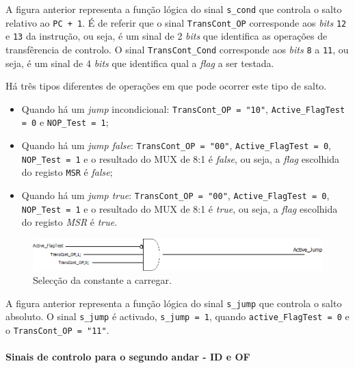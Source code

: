 \documentclass[11pt]{article}
\numberwithin{equation}{section}
\begin{document}
A figura anterior representa a função lógica do sinal \texttt{s\_cond} que controla o salto relativo ao \texttt{PC + 1}. É  de referir que o sinal \texttt{TransCont\_OP} corresponde aos \textit{bits} \texttt{12} e \texttt{13} da instrução, ou seja, é um sinal de 2 \textit{bits} que identifica as operações de transfêrencia de controlo. O sinal \texttt{TransCont\_Cond} corresponde aos \textit{bits} \texttt{8} a \texttt{11}, ou seja, é um sinal de 4 \textit{bits} que identifica qual a \textit{flag} a ser testada.

Há três tipos diferentes de operações em que pode ocorrer este tipo de salto.

\begin{itemize}
	\item Quando há um \textit{jump} incondicional: \texttt{TransCont\_OP = "10"}, \texttt{Active\_FlagTest = 0} e \texttt{NOP\_Test = 1};
	\vspace{-2.5mm}
	\item Quando há um \textit{jump false}: \texttt{TransCont\_OP = "00"}, \texttt{Active\_FlagTest = 0}, \texttt{NOP\_Test = 1} e o resultado do MUX de 8:1 é \textit{false}, ou seja, a \textit{flag} escolhida do registo \texttt{MSR} é \textit{false};
	\vspace{-2.5mm}
	\item Quando há um \textit{jump true}: \texttt{TransCont\_OP = "00"}, \texttt{Active\_FlagTest = 0}, \texttt{NOP\_Test = 1} e o resultado do MUX de 8:1 é \textit{true}, ou seja, a \textit{flag} escolhida do registo \textit{MSR} é \textit{true}.
\end{itemize}

\begin{figure}[H]
	\centering
	\includegraphics[keepaspectratio=true, scale=0.40]{imagens/activejump}
	\caption{Selecção da constante a carregar.}
	\vspace{-0.8em}
\end{figure}

A figura anterior representa a função lógica do sinal \texttt{s\_jump} que controla o salto absoluto. O sinal \texttt{s\_jump} é activado, \texttt{s\_jump = 1}, quando \texttt{active\_FlagTest = 0} e o \texttt{TransCont\_OP = "11"}.
 	
\paragraph{Sinais de controlo para o segundo andar - ID e OF}
\end{document}
